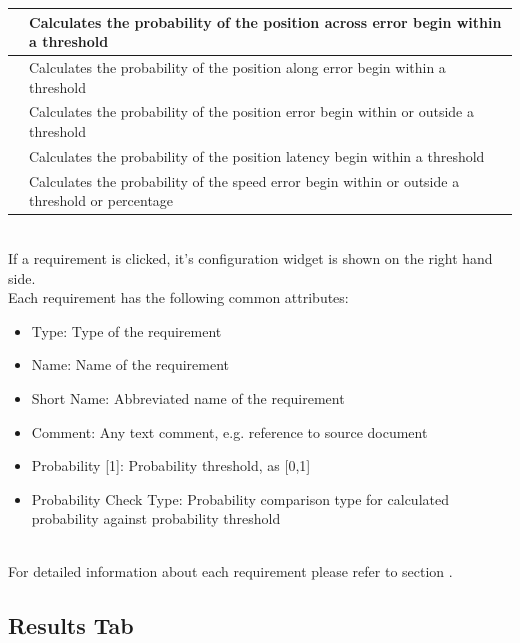 \begin{center}
\begin{table}[H]
\begin{tabularx}{\textwidth}{ | l | X |  }
    \nameref{sec:eval_req_pos_across} & Calculates the probability of the position across error begin within a threshold \\ \hline
    \nameref{sec:eval_req_pos_along} & Calculates the probability of the position along error begin within a threshold \\ \hline
    \nameref{sec:eval_req_pos_distance} & Calculates the probability of the position error begin within or outside a threshold \\ \hline
    \nameref{sec:eval_req_pos_latency}  & Calculates the probability of the position latency begin within a threshold \\ \hline
    \nameref{sec:eval_req_speed} & Calculates the probability of the speed error begin within or outside a threshold or percentage \\ \hline
\end{tabularx}
\end{table}
\end{center}
\ \\


If a requirement is clicked, it's configuration widget is shown on the right hand side. \\

Each requirement has the following common attributes:
\begin{itemize}  
\item Type: Type of the requirement
\item Name: Name of the requirement
\item Short Name: Abbreviated name of the requirement
\item Comment: Any text comment, e.g. reference to source document
\item Probability [1]: Probability threshold, as [0,1]
\item Probability Check Type: Probability comparison type for calculated probability against probability threshold
\end{itemize}
\ \\

For detailed information about each requirement please refer to section .

\subsection{Results Tab}


